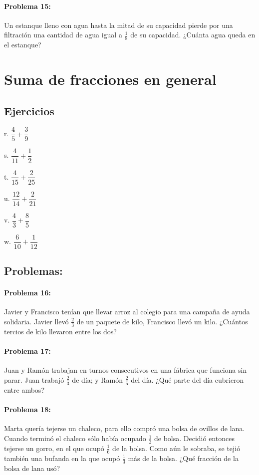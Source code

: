 \documentclass[10pt,twoside]{article}
\begin{document}
\paragraph*{Problema 15:} Un estanque lleno con agua hasta la mitad de su capacidad pierde por una filtración una cantidad de agua igual a $\frac{1}{8}$ de su capacidad. ¿Cuánta agua queda en el estanque?
\section*{Suma de fracciones en general}
\subsection*{Ejercicios}
\begin{enumerate}
\begin{multicols}{3}
\item[r.] $\dfrac{4}{5}+\dfrac{3}{9}$
\item[s.] $\dfrac{4}{11}+\dfrac{1}{2}$
\item[t.] $\dfrac{4}{15}+\dfrac{2}{25}$
\item[u.] $\dfrac{12}{14}+\dfrac{2}{21}$
\item[v.] $\dfrac{4}{3}+\dfrac{8}{5}$
\item[w.] $\dfrac{6}{10}+\dfrac{1}{12}$
\end{multicols}
\end{enumerate}
\subsection*{Problemas:}
\paragraph*{Problema 16:} Javier y Francisco tenían que llevar arroz al colegio para una campaña de ayuda solidaria. Javier llevó $\frac{2}{3}$ de un paquete de kilo, Francisco llevó un kilo. ¿Cuántos tercios de kilo llevaron entre los dos?
\paragraph*{Problema 17:} Juan y Ramón trabajan en turnos consecutivos en una fábrica que funciona sin parar. Juan trabajó $\frac{2}{3}$ de día; y Ramón $\frac{2}{5}$ del día. ¿Qué parte del día cubrieron entre ambos?
\paragraph*{Problema 18:} Marta quería tejerse un chaleco, para ello compró una bolsa de ovillos de lana. Cuando terminó el chaleco sólo había ocupado $\frac{1}{2}$ de bolsa. Decidió entonces tejerse un gorro, en el que ocupó $\frac{1}{6}$ de la bolsa. Como aún le sobraba, se tejió también una bufanda en la que ocupó $\frac{1}{3}$ más de la bolsa. ¿Qué
fracción de la bolsa de lana usó?
\end{document}
